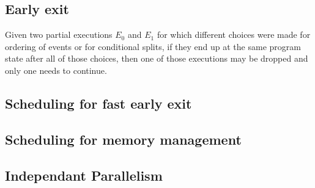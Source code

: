 \subsection{Early exit}

Given two partial executions $E_0$ and $E_1$ for which different choices were made for ordering of events or for conditional splits, if they end up at the same program state after all of those choices, then one of those executions may be dropped and only one needs to continue.

\subsection{Scheduling for fast early exit}



\subsection{Scheduling for memory management}

\subsection{Independant Parallelism}

